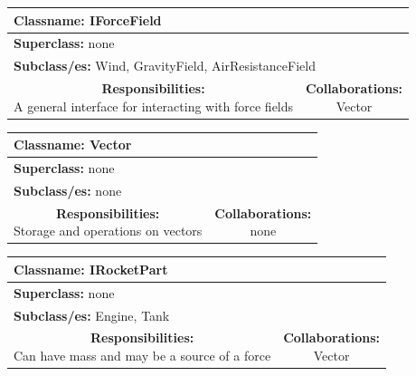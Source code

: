 \documentclass{article}
\begin{document}
\begin {center}
\begin{tabular}{|c|c|}
\hline
\multicolumn{2}{|l|}{\textbf{Classname:} IForceField}\\
\hline
\multicolumn{2}{|l|}{\textbf{Superclass:} none}\\
\multicolumn{2}{|l|}{\textbf{Subclass/es:} Wind, GravityField, AirResistanceField}\\
\hline
\parbox[]{5cm}{\vspace{3px}\textbf{Responsibilities:} \\A general interface for interacting with force fields\vspace{3px}} & \parbox[]{5cm}{\textbf{Collaborations:}\\Vector}\\
\hline
 \end{tabular}\vspace{.4cm}

\begin{tabular}{|c|c|}
\hline
\multicolumn{2}{|l|}{\textbf{Classname:} Vector}\\
\hline
\multicolumn{2}{|l|}{\textbf{Superclass:} none}\\
\multicolumn{2}{|l|}{\textbf{Subclass/es:} none}\\
\hline
\parbox[]{5cm}{\vspace{3px}\textbf{Responsibilities:} \\Storage and operations on vectors\vspace{3px}} & \parbox[]{5cm}{\textbf{Collaborations:}\\none}\\
\hline
 \end{tabular}\vspace{.4cm}

\begin{tabular}{|c|c|}
\hline
\multicolumn{2}{|l|}{\textbf{Classname:} IRocketPart}\\
\hline
\multicolumn{2}{|l|}{\textbf{Superclass:} none}\\
\multicolumn{2}{|l|}{\textbf{Subclass/es:} Engine, Tank}\\
\hline
\parbox[]{5cm}{\vspace{3px}\textbf{Responsibilities:} \\Can have mass and may be a source of a force\vspace{3px}} & \parbox[]{5cm}{\textbf{Collaborations:}\\Vector}\\
\hline
 \end{tabular}\vspace{.4cm}


\end{center}
\end{document}
